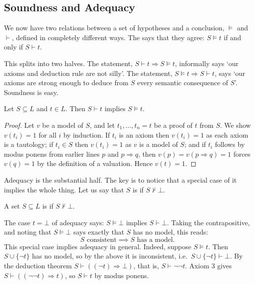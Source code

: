 \documentclass[a4paper]{scrartcl}
\begin{document}
\subsection{Soundness and Adequacy}

We now have two relations between a set of hypotheses and a conclusion, $\models$ and $\vdash$, defined in completely different ways. The  says that they agree: $S \models t$ if and only if $S \vdash t$.

This splits into two halves. The  statement, $S \vdash t \Rightarrow S \models t$, informally says `our axioms and deduction rule are not silly'. The  statement, $S \models t \Rightarrow S \vdash t$, says `our axioms are strong enough to deduce from $S$ every semantic consequence of $S$'. Soundness is easy.

\begin{proposition}[Soundness]
  Let $S \subseteq L$ and $t \in L$. Then $S \vdash t$ implies $S \models t$.
\end{proposition}
\begin{proof}
  Let $v$ be a model of $S$, and let $t_1, \dots, t_n = t$ be a proof of $t$ from $S$. We show $v(t_i) = 1$ for all $i$ by induction. If $t_i$ is an axiom then $v(t_i) = 1$ as each axiom is a tautology; if $t_i \in S$ then $v(t_i) = 1$ as $v$ is a model of $S$; and if $t_i$ follows by modus ponens from earlier lines $p$ and $p \Rightarrow q$, then $v(p) = v(p \Rightarrow q) = 1$ forces $v(q) = 1$ by the definition of a valuation. Hence $v(t) = 1$.
\end{proof}

Adequacy is the substantial half. The key is to notice that a special case of it implies the whole thing. Let us say that $S$ is  if $S \not\vdash \bot$.

\begin{definition}[Consistent]
  A set $S \subseteq L$ is  if $S \not\vdash \bot$.
\end{definition}

The case $t = \bot$ of adequacy says: $S \models \bot$ implies $S \vdash \bot$. Taking the contrapositive, and noting that $S \models \bot$ says exactly that $S$ has no model, this reads:
$$
\text{$S$ consistent} \implies \text{$S$ has a model.}
$$
This special case implies adequacy in general. Indeed, suppose $S \models t$. Then $S \cup \{\lnot t\}$ has no model, so by the above it is inconsistent, i.e.\ $S \cup \{\lnot t\} \vdash \bot$. By the deduction theorem $S \vdash ((\lnot t) \Rightarrow \bot)$, that is, $S \vdash \lnot \lnot t$. Axiom 3 gives $S \vdash ((\lnot\lnot t) \Rightarrow t)$, so $S \vdash t$ by modus ponens.
\end{document}
